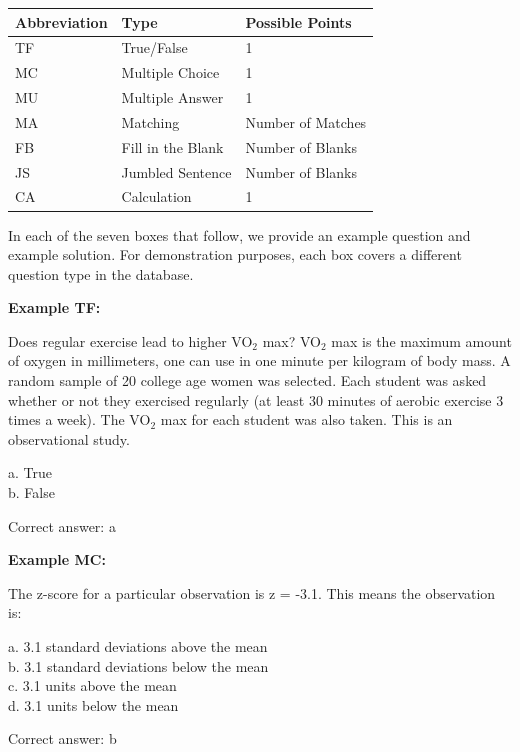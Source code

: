 \documentclass{article}\usepackage[]{graphicx}\usepackage[]{color}
\numberwithin{equation}{section} %
\begin{document}
\begin{center}
\label{tab:questionTypes}
\begin{tabular} { | l | l | l |}
\hline \textbf{Abbreviation} & \textbf{Type} & \textbf{Possible Points} \\
\hline
TF & True/False & 1 \\
\hline
MC & Multiple Choice & 1 \\
\hline
MU & Multiple Answer & 1 \\
\hline
MA & Matching & Number of Matches \\
\hline
FB & Fill in the Blank & Number of Blanks \\
\hline
JS & Jumbled Sentence & Number of Blanks \\
\hline
CA & Calculation & 1 \\
\hline
\end{tabular}
\end{center}

In each of the seven boxes that follow, we provide an example question and example solution. For demonstration purposes, each box covers a different question type in the database. \\

\begin{framed}
\textbf{Example TF:}

Does regular exercise lead to higher VO$_2$ max? VO$_2$ max is the maximum amount of oxygen in millimeters, one can use in one minute per kilogram of body mass. A random sample of 20 college age women was selected. Each student was asked whether or not they exercised regularly (at least 30 minutes of aerobic exercise 3 times a week). The VO$_2$ max for each student was also taken. This is an observational study.

a. True\\
b. False

Correct answer: a
\end{framed}

\begin{framed}
\textbf{Example MC:}

The z-score for a particular observation is z = -3.1. This means the observation is:

a. 3.1 standard deviations above the mean\\
b. 3.1 standard deviations below the mean\\
c. 3.1 units above the mean\\
d. 3.1 units below the mean

Correct answer: b
\end{framed}
\end{document}
